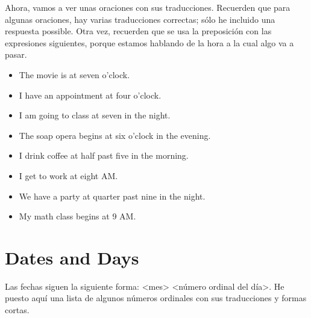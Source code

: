Ahora, vamos a ver unas oraciones con sus traducciones.
Recuerden que para algunas oraciones, hay varias traducciones correctas;
s\'olo he incluido una respuesta possible.
Otra vez, recuerden que se usa la preposici\'on  con las expresiones siguientes,
porque estamos hablando de la hora a la cual algo va a pasar.

\begin{itemize}
	\item {}
		\arr The movie is at seven o'clock.
	\item {}
		\arr I have an appointment at four o'clock.
	\item {}
		\arr I am going to class at seven in the night.
	\item {}
		\arr The soap opera begins at six o'clock in the evening.
	\item {}
		\arr I drink coffee at half past five in the morning.
	\item {}
		\arr I get to work at eight AM.
	\item {}
		\arr We have a party at quarter past nine in the night.
	\item {}
		\arr My math class begins at 9 AM.
\end{itemize}

\section{Dates and Days}

Las fechas siguen la siguiente forma: <mes> <número ordinal del d\'ia>.
He puesto aqu\'i una lista de algunos n\'umeros ordinales con sus traducciones y formas cortas.

